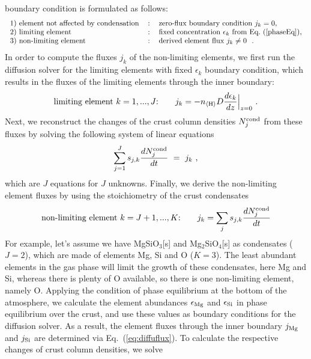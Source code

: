 \documentclass[11pt]{article}
\def\nH{n_{\langle\rm H\rangle}}
\def\ek{\epsilon_k}
\begin{document}
boundary condition is formulated as follows:
\begin{equation}
\mbox{\begin{tabular}{lcl}
  1) element not affected by condensation &:& zero-flux boundary
                                              condition $j_k=0$,\\
  2) limiting element &:& fixed concentration $\ek$ from
            Eq.~(\ref{phaseEq}),\\
  3) non-limiting element &:& derived element flux $j_k\neq0$  \ .
\end{tabular}}
\label{eq:innerBC}
\end{equation}
In order to compute the fluxes $j_k$ of the non-limiting elements,
we first run the diffusion solver for the limiting elements 
with fixed $\ek$ boundary condition, which results in the fluxes
of the limiting elements through the inner boundary:
\begin{equation}
  \mbox{limiting element $k=1,...,J$:}\quad\quad 
   j_k = -\nH D \frac{d\ek}{dz}\Big|_{z=0} \ .
  \label{eq:diffuflux}
\end{equation}
Next, we reconstruct the changes of the crust column densities
$N_j^{\rm cond}$ from these fluxes by solving the following system of
linear equations
\begin{equation}
  \sum_{j=1}^J s_{j,k} \frac{dN_j^{\rm cond}}{dt} ~=~ j_k \ ,
\end{equation}
which are $J$ equations for $J$ unknowns. Finally, we derive the
non-limiting element fluxes by using the stoichiometry of the 
crust condensates
\begin{equation}
  \mbox{non-limiting element $k=J+1,...,K$:}\quad\quad 
  j_k = \sum_j s_{j,k} \frac{dN_j^{\rm cond}}{dt}
\end{equation}
For example, let's assume we have MgSiO$_3$[s] and Mg$_2$SiO$_4$[s] as
condensates ($J=2$), which are made of elements Mg, Si and O
($K=3$). The least abundant elements in the gas phase will limit the
growth of these condensates, here Mg and Si, whereas there is plenty
of O available, so there is one non-limiting element, namely
O. Applying the condition of phase equilibrium at the bottom of the
atmosphere, we calculate the element abundances $\epsilon_{\rm Mg}$
and $\epsilon_{\rm Si}$ in phase equilibrium over the crust, and use
these values as boundary conditions for the diffusion solver. As a
result, the element fluxes through the inner boundary $j_{\rm Mg}$ and
$j_{\rm Si}$ are determined via Eq.~(\ref{eq:diffuflux}). To calculate
the respective changes of crust column densities, we solve
\end{document}
